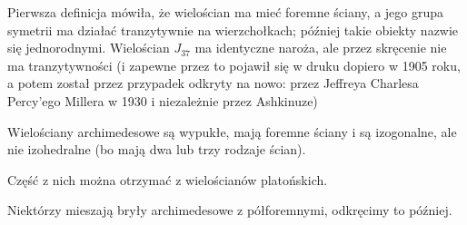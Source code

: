 Pierwsza definicja mówiła, że wielościan ma mieć foremne ściany, a jego grupa symetrii ma działać tranzytywnie na wierzchołkach; później takie obiekty nazwie się jednorodnymi.
Wielościan $J_{37}$ ma identyczne naroża, ale przez skręcenie nie ma tranzytywności (i zapewne przez to pojawił się w druku dopiero w 1905 roku, a potem został przez przypadek odkryty na nowo: przez Jeffreya Charlesa Percy'ego Millera w 1930 i niezależnie przez Ashkinuze)


Wielościany archimedesowe są wypukłe, mają foremne ściany i są izogonalne, ale nie izohedralne (bo mają dwa lub trzy rodzaje ścian).

Część z nich można otrzymać z wielościanów platońskich.

Niektórzy mieszają bryły archimedesowe z półforemnymi, odkręcimy to później.